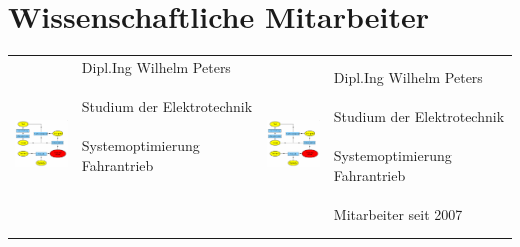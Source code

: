 
\section*{Wissenschaftliche Mitarbeiter}

	\begin{tabular}{p{2.1cm}p{6cm}p{2cm}p{6cm}}
	\parbox[c]{2cm}{\includegraphics[width=2cm]{Bilder/toolkit.eps}} 	\hfill 	 	
	& \parbox[c]{5.9cm}{
			\Large Dipl.Ing Wilhelm Peters \normalsize \\
			\phantom{test}\\
			Studium der Elektrotechnik\\
			\\
			Systemoptimierung Fahrantrieb\\
			\\
			\phantom{test}\\
			\phantom{test}\\
		}	
	&	\parbox[c]{2cm}{\includegraphics[width=2cm]{Bilder/toolkit.eps}}  	\hfill 		
	
	& \parbox[c]{5.9cm}{
			\Large Dipl.Ing Wilhelm Peters \normalsize \\
			\phantom{test}\\
			Studium der Elektrotechnik\\
			\\
			Systemoptimierung Fahrantrieb\\
			\\
			Mitarbeiter seit 2007
			\\
		}\\
		

\end{tabular}
